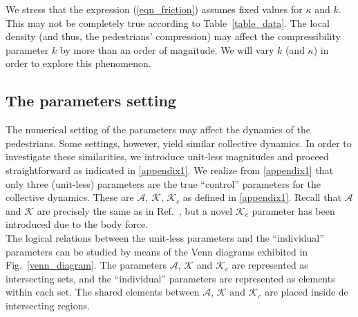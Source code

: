 \documentclass[preprint,12pt]{elsarticle}
\begin{document}
We stress that the expression (\ref{eqn_friction}) assumes fixed values for 
$\kappa$ and $k$. This may not be completely true according to 
Table~\ref{table_data}. The local density (and thus, the pedestrians' 
compression) may affect the compressibility parameter $k$ by more than an order 
of magnitude. We will vary $k$ (and $\kappa$) in order to explore this 
phenomenon. \\  


\subsection{\label{parameters}The parameters setting}

The numerical setting of the parameters may affect the dynamics of the 
pedestrians. Some settings, however, yield similar collective dynamics. In 
order to investigate these similarities, we introduce unit-less magnitudes 
and proceed straightforward as indicated in \ref{appendix1}. We realize from 
\ref{appendix1} that only three (unit-less) parameters  are the true 
``control'' parameters for the collective dynamics. These are $\mathcal{A}$, 
$\mathcal{K}$, $\mathcal{K}_c$ as defined in \ref{appendix1}. Recall that 
$\mathcal{A}$ and $\mathcal{K}$ are precisely the same as in 
Ref.~\cite{dorso_2019}, but a novel $\mathcal{K}_c$ parameter has been 
introduced due to the body force.   \\

The logical relations between the unit-less parameters and the ``individual'' 
parameters can be studied by means of the Venn diagrams exhibited in 
Fig.~\ref{venn_diagram}. The parameters $\mathcal{A}$, $\mathcal{K}$ and 
$\mathcal{K}_c$ are represented as intersecting sets, and the ``individual'' 
parameters are represented as elements within each set. The shared elements 
between $\mathcal{A}$, $\mathcal{K}$ and $\mathcal{K}_c$ are placed inside de 
intersecting regions. \\
\end{document}
